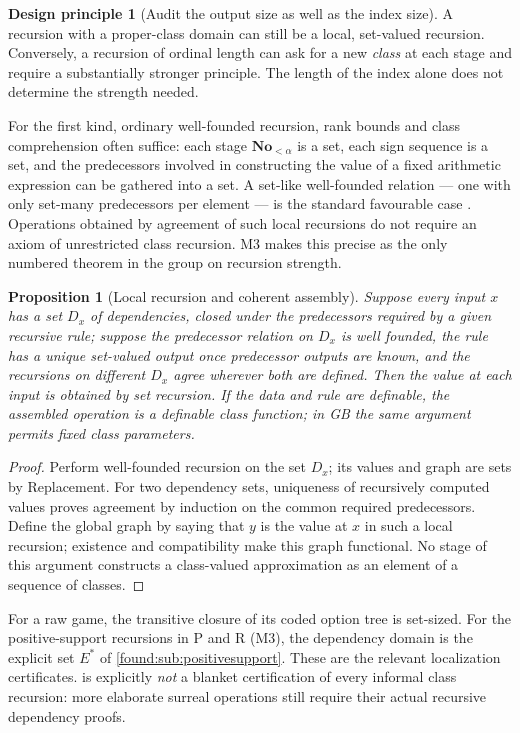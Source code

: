 \documentclass[11pt,letterpaper]{article}
\numberwithin{equation}{section}
\newtheorem{proposition}[theorem]{Proposition}
\theoremstyle{definition}
\newtheorem{principle}[theorem]{Design principle}
\theoremstyle{remark}
\newcommand{\No}{\mathbf{No}}
\begin{document}
\begin{principle}[Audit the output size as well as the index size]\label{found:prin:recursion}
A recursion with a proper-class domain can still be a local, set-valued
recursion. Conversely, a recursion of ordinal length can ask for a new
\emph{class} at each stage and require a substantially stronger principle. The
length of the index alone does not determine the strength needed.
\end{principle}

For the first kind, ordinary well-founded recursion, rank bounds and class
comprehension often suffice: each stage $\No_{<\alpha}$ is a set, each sign
sequence is a set, and the predecessors involved in constructing the value of a
fixed arithmetic expression can be gathered into a set. A set-like well-founded
relation --- one with only set-many predecessors per element --- is the standard
favourable case \cite{found:HamkinsRecursion}. Operations obtained by agreement
of such local recursions do not require an axiom of unrestricted class
recursion. M3 makes this precise as the only numbered theorem in the group on
recursion strength.

\begin{proposition}[Local recursion and coherent assembly]\label{found:prop:recursion}
Suppose every input $x$ has a set $D_x$ of dependencies, closed under the
predecessors required by a given recursive rule; suppose the predecessor
relation on $D_x$ is well founded, the rule has a unique set-valued output once
predecessor outputs are known, and the recursions on different $D_x$ agree
wherever both are defined. Then the value at each input is obtained by set
recursion. If the data and rule are definable, the assembled operation is a
definable class function; in GB the same argument permits fixed class
parameters.
\end{proposition}
\begin{proof}
Perform well-founded recursion on the set $D_x$; its values and graph are sets
by Replacement. For two dependency sets, uniqueness of recursively computed
values proves agreement by induction on the common required predecessors.
Define the global graph by saying that $y$ is the value at $x$ in such a local
recursion; existence and compatibility make this graph functional. No stage of
this argument constructs a class-valued approximation as an element of a
sequence of classes.
\end{proof}

For a raw game, the transitive closure of its coded option tree is set-sized.
For the positive-support recursions in P and R (M3), the dependency domain is
the explicit set $E^*$ of \cref{found:sub:positivesupport}. These are the
relevant localization certificates.  is explicitly
\emph{not} a blanket certification of every informal class recursion: more
elaborate surreal operations still require their actual recursive dependency
proofs.
\end{document}
